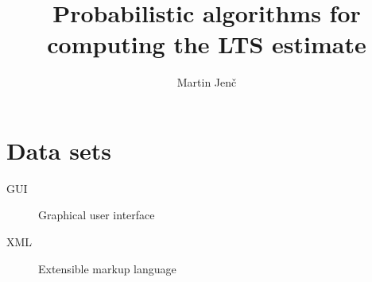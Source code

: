 \documentclass[thesis=B,english]{FITthesis}[2012/10/20]
\title{Probabilistic algorithms for computing the LTS estimate}
\author{Martin Jen{\v c}} %
\begin{document}


























\appendix

\chapter{Data sets}
\begin{description}
	\item[GUI] Graphical user interface
	\item[XML] Extensible markup language
\end{description}
\end{document}
